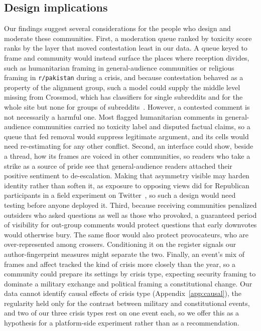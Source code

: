 \subsection{Design implications}
\label{sec:disc-design}

Our findings suggest several considerations for the people who design and moderate these communities. First, a moderation queue ranked by toxicity score ranks by the layer that moved contestation least in our data. A queue keyed to frame and community would instead surface the places where reception divides, such as humanitarian framing in general-audience communities or religious framing in \texttt{r/pakistan} during a crisis, and because contestation behaved as a property of the alignment group, such a model could supply the middle level missing from Crossmod, which has classifiers for single subreddits and for the whole site but none for groups of subreddits~\cite{chandrasekharan2019crossmod}. However, a contested comment is not necessarily a harmful one. Most flagged humanitarian comments in general-audience communities carried no toxicity label and disputed factual claims, so a queue that fed removal would suppress legitimate argument, and its cells would need re-estimating for any other conflict. Second, an interface could show, beside a thread, how its frames are voiced in other communities, so readers who take a strike as a source of pride see that general-audience readers attached their positive sentiment to de-escalation. Making that asymmetry visible may harden identity rather than soften it, as exposure to opposing views did for Republican participants in a field experiment on Twitter~\cite{bail2018exposure}, so such a design would need testing before anyone deployed it. Third, because receiving communities penalized outsiders who asked questions as well as those who provoked, a guaranteed period of visibility for out-group comments would protect questions that early downvotes would otherwise bury. The same floor would also protect provocateurs, who are over-represented among crossers. Conditioning it on the register signals our author-fingerprint measures might separate the two. Finally, an event's mix of frames and affect tracked the kind of crisis more closely than the year, so a community could prepare its settings by crisis type, expecting security framing to dominate a military exchange and political framing a constitutional change. Our data cannot identify causal effects of crisis type (Appendix~\ref{app:causal}), the regularity held only for the contrast between military and constitutional events, and two of our three crisis types rest on one event each, so we offer this as a hypothesis for a platform-side experiment rather than as a recommendation.



